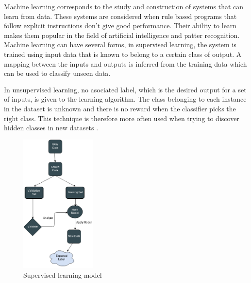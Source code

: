 Machine learning corresponds to the study and construction of systems that can learn from data. These systems are considered when rule based programs that follow explicit instructions don't give good performance. Their ability to learn makes them popular in the field of artificial intelligence and patter recognition. Machine learning can have several forms, in supervised learning, the system is trained using input data that is known to belong to a certain class of output. A mapping between the inputs and outputs is inferred from the training data which can be used to classify unseen data.\cite{cord2008machine}

In unsupervised learning, no asociated label, which is the desired output for a set of inputs, is given to the learning algorithm. The class belonging to each instance in the dataset is unknown and there is no reward when the classifier picks the right class. This technique is therefore more often used when trying to discover hidden classes in new datasets \cite{maglogiannis2007emerging}.


\begin{figure}[H]
\centering
    \includegraphics[width=38mm,scale=0.3]{./img/SL.png}
    \caption{\footnotesize{Supervised learning model}}
    \label{fig:SL}
\end{figure}



